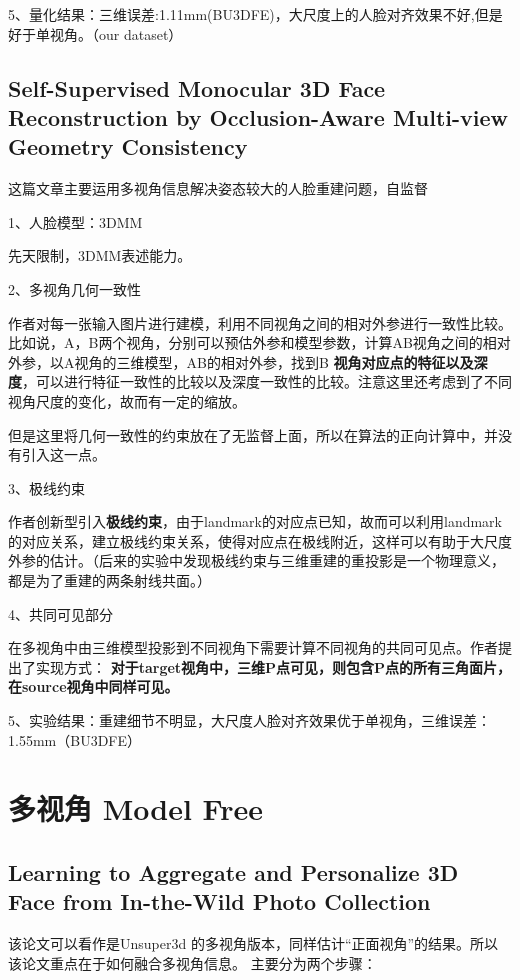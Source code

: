 \documentclass[UTF8,12pt]{article} %
\theoremstyle{definition}
\begin{document}
5、量化结果：三维误差:1.11mm(BU3DFE)，大尺度上的人脸对齐效果不好,但是好于单视角。（our dataset）
	
\subsection{Self-Supervised Monocular 3D Face Reconstruction by Occlusion-Aware Multi-view Geometry Consistency}
这篇文章主要运用多视角信息解决姿态较大的人脸重建问题，自监督

1、人脸模型：3DMM

	先天限制，3DMM表述能力。

2、多视角几何一致性

	作者对每一张输入图片进行建模，利用不同视角之间的相对外参进行一致性比较。比如说，A，B两个视角，分别可以预估外参和模型参数，计算AB视角之间的相对外参，以A视角的三维模型，AB的相对外参，找到B \textbf{视角对应点的特征以及深度}，可以进行特征一致性的比较以及深度一致性的比较。注意这里还考虑到了不同视角尺度的变化，故而有一定的缩放。
	
	但是这里将几何一致性的约束放在了无监督上面，所以在算法的正向计算中，并没有引入这一点。
	
3、极线约束

	作者创新型引入\textbf{极线约束}，由于landmark的对应点已知，故而可以利用landmark的对应关系，建立极线约束关系，使得对应点在极线附近，这样可以有助于大尺度外参的估计。（后来的实验中发现极线约束与三维重建的重投影是一个物理意义，都是为了重建的两条射线共面。）
	
4、共同可见部分

	在多视角中由三维模型投影到不同视角下需要计算不同视角的共同可见点。作者提出了实现方式：
	\textbf{对于target视角中，三维P点可见，则包含P点的所有三角面片，在source视角中同样可见。}
	
5、实验结果：重建细节不明显，大尺度人脸对齐效果优于单视角，三维误差：1.55mm（BU3DFE）

\section{多视角 Model Free}

\subsection{Learning to Aggregate and Personalize 3D Face from In-the-Wild Photo Collection}

该论文可以看作是Unsuper3d 的多视角版本，同样估计“正面视角”的结果。所以该论文重点在于如何融合多视角信息。
主要分为两个步骤：
\end{document}

